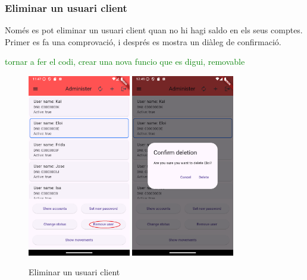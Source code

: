 \documentclass[a4paper,12pt,twoside]{ThesisStyle}
\newcommand{\sudan}[1]{\textcolor{green}{#1}}
\begin{document}
\clearpage
\subsubsection{Eliminar un usuari client}
\label{subsubsec: Eliminar un usuari client}

Només es pot eliminar un usuari client quan no hi hagi saldo en els seus comptes. Primer es fa una comprovació, i després es mostra un diàleg de confirmació.

\sudan{tornar a fer el codi, crear una nova funcio que es digui, removable}

\begin{figure}[h]
    \centering
    \includegraphics[width=0.4\textwidth]{imatges/mainAdmin4.png}
    \includegraphics[width=0.4\textwidth]{imatges/delete1.png}
    \caption{Eliminar un usuari client}
    \label{fig: Eliminar un usuari client}
\end{figure}
\end{document}
